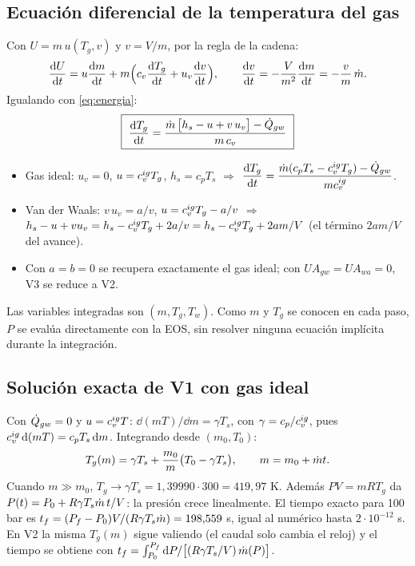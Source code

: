 \subsection{Ecuación diferencial de la temperatura del gas}
Con $U=m\,u(T_g,v)$ y $v=V/m$, por la regla de la cadena:
\[
\frac{\mathrm{d} U}{\mathrm{d} t}=u\frac{\mathrm{d} m}{\mathrm{d} t}+m\Big(c_v\frac{\mathrm{d} T_g}{\mathrm{d} t}+u_v\frac{\mathrm{d} v}{\mathrm{d} t}\Big),\qquad
\frac{\mathrm{d} v}{\mathrm{d} t}=-\frac{V}{m^2}\frac{\mathrm{d} m}{\mathrm{d} t}=-\frac{v}{m}\,\dot m .
\]
Igualando con \eqref{eq:energia}:
\begin{equation}\label{eq:dTdt}
\boxed{\ \frac{\mathrm{d} T_g}{\mathrm{d} t}=\frac{\dot m\,\big[h_s-u+v\,u_v\big]-\dot Q_{gw}}{m\,c_v}\ }
\end{equation}
\begin{itemize}
\item Gas ideal: $u_v=0$, $u=c_v^{ig} T_g$, $h_s=c_pT_s$ $\Rightarrow$ $\dfrac{\mathrm{d} T_g}{\mathrm{d} t}=\dfrac{\dot m(c_pT_s-c_v^{ig} T_g)-\dot Q_{gw}}{mc_v^{ig}}$.
\item Van der Waals: $v\,u_v=a/v$, $u=c_v^{ig} T_g-a/v$ $\Rightarrow$ $h_s-u+vu_v=h_s-c_v^{ig} T_g+2a/v=h_s-c_v^{ig} T_g+2am/V$
(el término $2am/V$ del avance).
\item Con $a=b=0$ se recupera exactamente el gas ideal; con $UA_{gw}=UA_{wa}=0$, V3 se reduce a V2.
\end{itemize}
Las variables integradas son $(m,T_g,T_w)$. Como $m$ y $T_g$ se conocen en cada paso, $P$ se evalúa
directamente con la EOS, sin resolver ninguna ecuación implícita durante la integración.

\subsection{Solución exacta de V1 con gas ideal}
Con $\dot Q_{gw}=0$ y $u=c_v^{ig} T$: $\dd(mT)/\dd m=\gamma T_s$, con $\gamma=c_p/c_v^{ig}$, pues
$c_v^{ig}\,\mathrm{d}(mT)=c_pT_s\,\mathrm{d} m$. Integrando desde $(m_0,T_0)$:
\begin{equation}\label{eq:v1}
T_g(m)=\gamma T_s+\frac{m_0}{m}\big(T_0-\gamma T_s\big),\qquad m=m_0+\dot m t .
\end{equation}
Cuando $m\gg m_0$, $T_g\to\gamma T_s=1{,}39990\cdot300=419{,}97$ K. Además $PV=mRT_g$ da
$P(t)=P_0+R\gamma T_s\dot m\,t/V$: la presión crece linealmente. El tiempo exacto para 100 bar es
$t_f=(P_f-P_0)V/(R\gamma T_s\dot m)=198{,}559$ s, igual al numérico hasta $2\cdot10^{-12}$ s.
En V2 la misma $T_g(m)$ sigue valiendo (el caudal solo cambia el reloj) y el tiempo se obtiene con
$t_f=\int_{P_0}^{P_f}\mathrm{d} P/\big[(R\gamma T_s/V)\,\dot m(P)\big]$.

